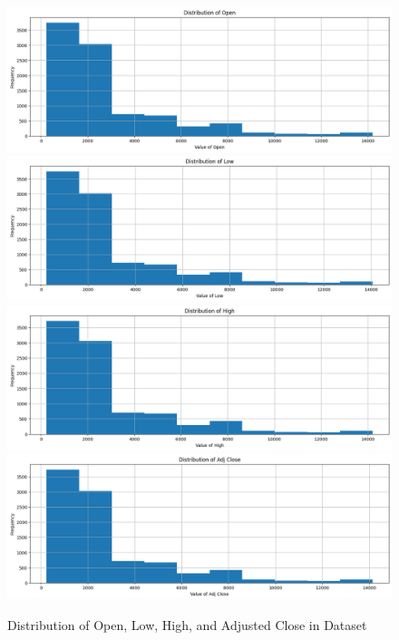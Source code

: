 \documentclass[a4paper, 11pt]{article}
\begin{document}
\begin{figure}
    \begin{center}
        \includegraphics[width=1\textwidth]{Distribution of Open.png}
        \includegraphics[width=1\textwidth]{Distribution of Low.png}
        \includegraphics[width=1\textwidth]{Distribution of High.png}
        \includegraphics[width=1\textwidth]{Distribution of Adjusted Close.png}
        \caption{Distribution of Open, Low, High, and Adjusted Close in Dataset}
    \end{center}
\end{figure}
\end{document}
